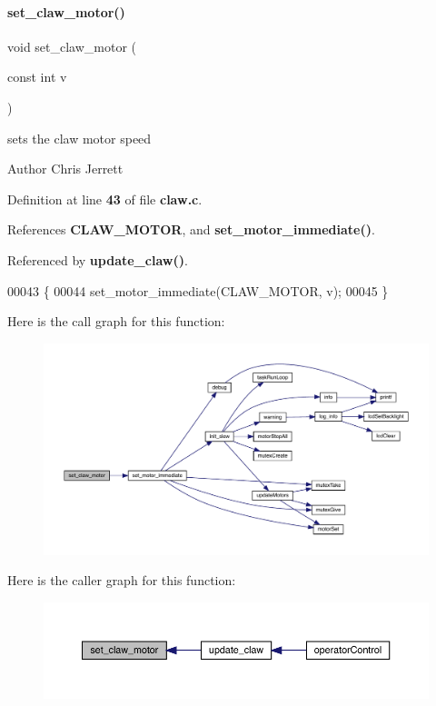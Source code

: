 \paragraph{set\+\_\+claw\+\_\+motor()}
{\footnotesize\ttfamily void set\+\_\+claw\+\_\+motor (\begin{DoxyParamCaption}\item[{const int}]{v }\end{DoxyParamCaption})}



sets the claw motor speed 

\begin{DoxyAuthor}{Author}
Chris Jerrett 
\end{DoxyAuthor}


Definition at line \textbf{ 43} of file \textbf{ claw.\+c}.



References \textbf{ C\+L\+A\+W\+\_\+\+M\+O\+T\+OR}, and \textbf{ set\+\_\+motor\+\_\+immediate()}.



Referenced by \textbf{ update\+\_\+claw()}.


\begin{DoxyCode}
00043                                 \{
00044   set_motor_immediate(CLAW_MOTOR, v);
00045 \}
\end{DoxyCode}
Here is the call graph for this function\+:\nopagebreak
\begin{figure}[H]
\begin{center}
\leavevmode
\includegraphics[width=350pt]{claw_8h_a3a57f998b1884d39b0cc786689f7086f_cgraph}
\end{center}
\end{figure}
Here is the caller graph for this function\+:\nopagebreak
\begin{figure}[H]
\begin{center}
\leavevmode
\includegraphics[width=350pt]{claw_8h_a3a57f998b1884d39b0cc786689f7086f_icgraph}
\end{center}
\end{figure}
\mbox{\label{claw_8h_a0122b78972344264b8a276a559cfce4a}} 
